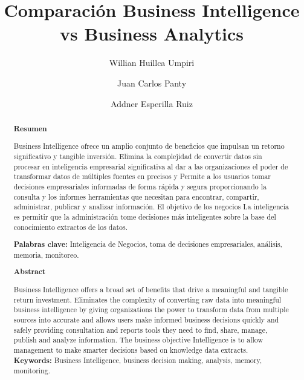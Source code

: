 \documentclass[%
 reprint,
 amsmath,amssymb,
 aps,
]{revtex4-1}
\begin{document}
\title{Comparación Business Intelligence vs Business Analytics}
\author{Willian Huillca Umpiri}
\author{Juan Carlos Panty}
\author{Addner Esperilla Ruiz}

%

\begin{abstract}
\begin{center}
\textbf{Resumen}
\end{center}

Business Intelligence ofrece un amplio conjunto de beneficios que impulsan un retorno significativo y tangible
inversión. Elimina la complejidad de convertir datos sin procesar en inteligencia empresarial significativa al dar a las organizaciones el poder de transformar datos de múltiples fuentes en precisos y Permite a los usuarios
tomar decisiones empresariales informadas de forma rápida y segura proporcionando la consulta y los informes
herramientas que necesitan para encontrar, compartir, administrar, publicar y analizar información. El objetivo de los negocios
La inteligencia es permitir que la administración tome decisiones más inteligentes sobre la base del conocimiento
extractos de los datos.

\textbf{Palabras clave:}  Inteligencia de Negocios, toma de decisiones empresariales, análisis, memoria, monitoreo.\\
\begin{center}
\textbf{Abstract}
\end{center}
Business Intelligence offers a broad set of benefits that drive a meaningful and tangible return
investment. Eliminates the complexity of converting raw data into meaningful business intelligence by giving organizations the power to transform data from multiple sources into accurate and allows users
make informed business decisions quickly and safely providing consultation and reports
tools they need to find, share, manage, publish and analyze information. The business objective
Intelligence is to allow management to make smarter decisions based on knowledge
data extracts.
\\

\textbf{Keywords:}  Business Intelligence, business decision making, analysis, memory, monitoring.\\
\end{abstract}

\maketitle
\end{document}

